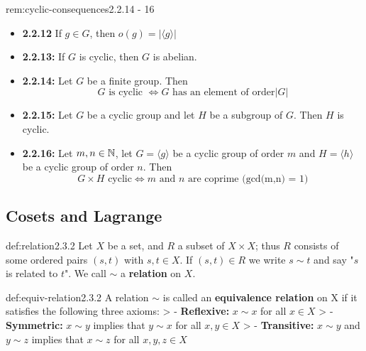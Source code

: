 \documentclass[8pt]{extarticle}
\begin{document}
\begin{multicols}{2}
\begin{rem}{rem:cyclic-consequences}{2.2.14 - 16}
    \renewcommand\labelitemi{\tiny$\bullet$}
    \begin{itemize}
        \setlength\itemsep{0em}
        \item \textbf{2.2.12} If $g\in G$, then $o(g)=\lvert \langle g \rangle \rvert$
        \item \textbf{2.2.13:} If $G$ is cyclic, then $G$ is abelian.
        \item \textbf{2.2.14:} Let $G$ be a finite group. Then
        $$G \text{ is cyclic } \iff G \text{ has an element of order} \lvert  G\rvert $$
        \item \textbf{2.2.15:} Let $G$ be a cyclic group and let $H$ be a subgroup of $G$. Then $H$ is cyclic.
        \item \textbf{2.2.16:} Let $m,n\in \mathbb{N}$, let $G=\langle g \rangle$ be a cyclic group of order $m$ and $H=\langle h \rangle$ be a cyclic group of order $n$. Then
        $$G \times H \text{ cyclic} \iff m \text{ and } n \text{ are coprime (gcd(m,n) = 1)}$$
    \end{itemize}
\end{rem}

\subsection{Cosets and Lagrange}

\begin{dfn}[Relation]{def:relation}{2.3.2}
    Let $X$ be a set, and $R$ a subset of $X\times X$; thus $R$ consists of some ordered pairs $(s,t)$ with $s,t\in X$. If $(s,t) \in R$ we write $s \sim t$ and say "$s$ is related to $t$". We call $\sim$ a \textbf{relation} on $X$.
\end{dfn}

\begin{dfn}{def:equiv-relation}{2.3.2}
    A relation $\sim$ is called an \textbf{equivalence relation} on X if it satisfies the following three axioms:
    > - \textbf{Reflexive:} $x\sim x$ for all $x\in X$
    > - \textbf{Symmetric:} $x\sim y$ implies that $y\sim x$ for all $x,y\in X$
    > - \textbf{Transitive:} $x\sim y$ and $y\sim z$ implies that $x\sim z$ for all $x,y,z\in X$
\end{dfn}


\lipsum[1-12]

\end{multicols}
\end{document}
